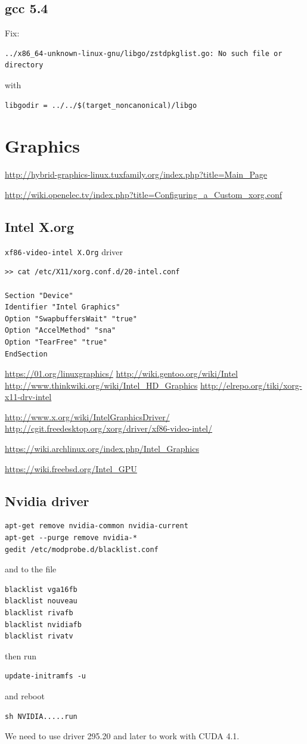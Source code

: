 \subsection{gcc 5.4}
\label{sec:gcc-5.4-build}

Fix:
\begin{verbatim}
../x86_64-unknown-linux-gnu/libgo/zstdpkglist.go: No such file or directory
\end{verbatim}
with
\begin{verbatim}
libgodir = ../../$(target_noncanonical)/libgo
\end{verbatim}



\section{Graphics}

\url{http://hybrid-graphics-linux.tuxfamily.org/index.php?title=Main_Page}

\url{http://wiki.openelec.tv/index.php?title=Configuring_a_Custom_xorg.conf}
\subsection{Intel X.org}

\verb!xf86-video-intel X.Org! driver
\begin{verbatim}
>> cat /etc/X11/xorg.conf.d/20-intel.conf
 
Section "Device"
Identifier "Intel Graphics"
Option "SwapbuffersWait" "true"
Option "AccelMethod" "sna"
Option "TearFree" "true"
EndSection
\end{verbatim}

\url{https://01.org/linuxgraphics/}
\url{http://wiki.gentoo.org/wiki/Intel}
\url{http://www.thinkwiki.org/wiki/Intel_HD_Graphics}
\url{http://elrepo.org/tiki/xorg-x11-drv-intel}

\url{http://www.x.org/wiki/IntelGraphicsDriver/}
\url{http://cgit.freedesktop.org/xorg/driver/xf86-video-intel/}

\url{https://wiki.archlinux.org/index.php/Intel_Graphics}

\url{https://wiki.freebsd.org/Intel_GPU}

\subsection{Nvidia driver}
\label{sec:Nvidia_driver}

\begin{verbatim}
apt-get remove nvidia-common nvidia-current
apt-get --purge remove nvidia-*
gedit /etc/modprobe.d/blacklist.conf
\end{verbatim}
and to the file
\begin{verbatim}
blacklist vga16fb
blacklist nouveau
blacklist rivafb
blacklist nvidiafb
blacklist rivatv
\end{verbatim}
then run
\begin{verbatim}
update-initramfs -u
\end{verbatim}
and reboot
\begin{verbatim}
sh NVIDIA.....run
\end{verbatim}
We need to use driver 295.20 and later to work with CUDA 4.1. 

